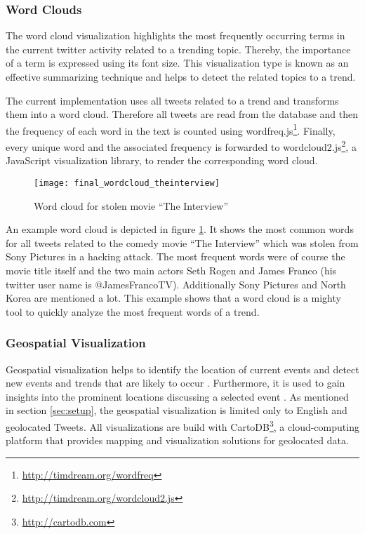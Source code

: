 \subsubsection{Word Clouds}
\label{subsubsec:vis-word-clouds}
The word cloud visualization highlights the most frequently occurring terms in the current twitter activity related to a trending topic. Thereby, the importance of a term is expressed using its font size. This visualization type is known as an effective summarizing technique and helps to detect the related topics to a trend.

The current implementation uses all tweets related to a trend and transforms them into a word cloud. Therefore all tweets are read from the database and then the frequency of each word in the text is counted using wordfreq.js\footnote{\url{http://timdream.org/wordfreq} \accessednote}. Finally, every unique word and the associated frequency is forwarded to wordcloud2.js\footnote{\url{http://timdream.org/wordcloud2.js} \accessednote}, a JavaScript visualization library, to render the corresponding word cloud.

\begin{figure}[H]
  \centering
        \texttt{[image: final\_wordcloud\_theinterview]}
  \caption[Word cloud for stolen movie \enquote{The Interview}]{Word cloud for stolen movie \enquote{The Interview}}
  \label{fig:word-cloud-interview}
  \vspace{-1.3em}
\end{figure}

An example word cloud is depicted in figure \ref{fig:word-cloud-interview}. It shows the most common words for all tweets related to the comedy movie \enquote{The Interview} which was stolen from Sony Pictures in a hacking attack. The most frequent words were of course the movie title itself and the two main actors Seth Rogen and James Franco (his twitter user name is @JamesFrancoTV). Additionally Sony Pictures and North Korea are mentioned a lot. This example shows that a word cloud is a mighty tool to quickly analyze the most frequent words of a trend.


\subsubsection{Geospatial Visualization}
\label{subsubsection:vis-geospatial}
Geospatial visualization helps to identify the location of current events and detect new events and trends that are likely to occur \cite{TwitterDataAnalytics2013}. Furthermore, it is used to gain insights into the prominent locations discussing a selected event \cite[64-66]{TwitterDataAnalytics2013}. As mentioned in section \ref{sec:setup}, the geospatial visualization is limited only to English and geolocated Tweets. All visualizations are build with CartoDB\footnote{\url{http://cartodb.com} \accessednote}, a cloud-computing platform that provides mapping and visualization solutions for geolocated data. 


